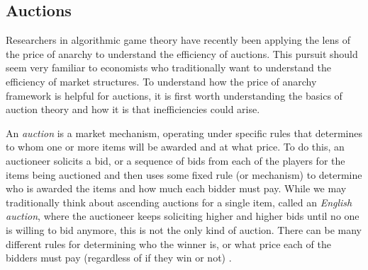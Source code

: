 \documentclass[12pt,twoside]{reedthesis}
\begin{document}
\label{sec:routinggames}

\subsection{Auctions}
Researchers in algorithmic game theory have recently been applying the lens of the price of anarchy to understand the efficiency of auctions. This pursuit should seem very familiar to economists who traditionally want to understand the efficiency of market structures. To understand how the price of anarchy framework is helpful for auctions, it is first worth understanding the basics of auction theory and how it is that inefficiencies could arise. 

An \textit{auction} is a market mechanism, operating under specific rules that determines to whom one or more items will be awarded and at what price. To do this, an auctioneer solicits a bid, or a sequence of bids from each of the players for the items being auctioned and then uses some fixed rule (or mechanism) to determine who is awarded the items and how much each bidder must pay. While we may traditionally think about ascending auctions for a single item, called an {\em English auction}, where the auctioneer keeps soliciting higher and higher bids until no one is willing to bid anymore, this is not the only kind of auction. There can be many different rules for determining who the winner is, or what price each of the bidders must pay (regardless of if they win or not) \citep{Mochon2015}.
\end{document}
